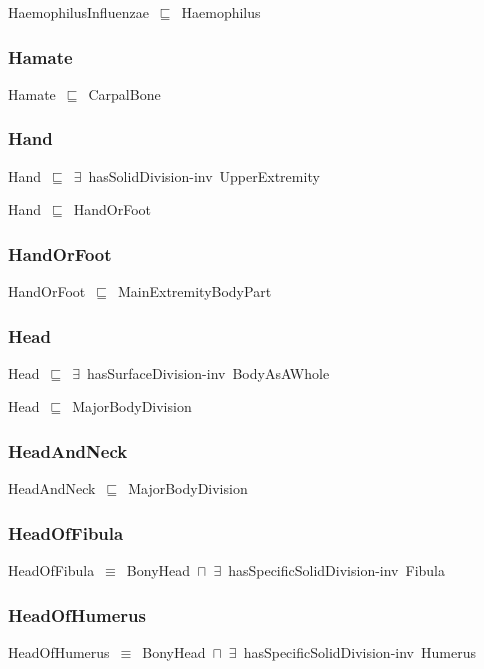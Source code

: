 \documentclass{article}
\begin{document}
HaemophilusInfluenzae~\ensuremath{\sqsubseteq}~Haemophilus~

\subsubsection*{Hamate}

Hamate~\ensuremath{\sqsubseteq}~CarpalBone~

\subsubsection*{Hand}

Hand~\ensuremath{\sqsubseteq}~\ensuremath{\exists}~hasSolidDivision-inv~UpperExtremity~

Hand~\ensuremath{\sqsubseteq}~HandOrFoot~

\subsubsection*{HandOrFoot}

HandOrFoot~\ensuremath{\sqsubseteq}~MainExtremityBodyPart~

\subsubsection*{Head}

Head~\ensuremath{\sqsubseteq}~\ensuremath{\exists}~hasSurfaceDivision-inv~BodyAsAWhole~

Head~\ensuremath{\sqsubseteq}~MajorBodyDivision~

\subsubsection*{HeadAndNeck}

HeadAndNeck~\ensuremath{\sqsubseteq}~MajorBodyDivision~

\subsubsection*{HeadOfFibula}

HeadOfFibula~\ensuremath{\equiv}~BonyHead~\ensuremath{\sqcap}~\ensuremath{\exists}~hasSpecificSolidDivision-inv~Fibula

\subsubsection*{HeadOfHumerus}

HeadOfHumerus~\ensuremath{\equiv}~BonyHead~\ensuremath{\sqcap}~\ensuremath{\exists}~hasSpecificSolidDivision-inv~Humerus
\end{document}
